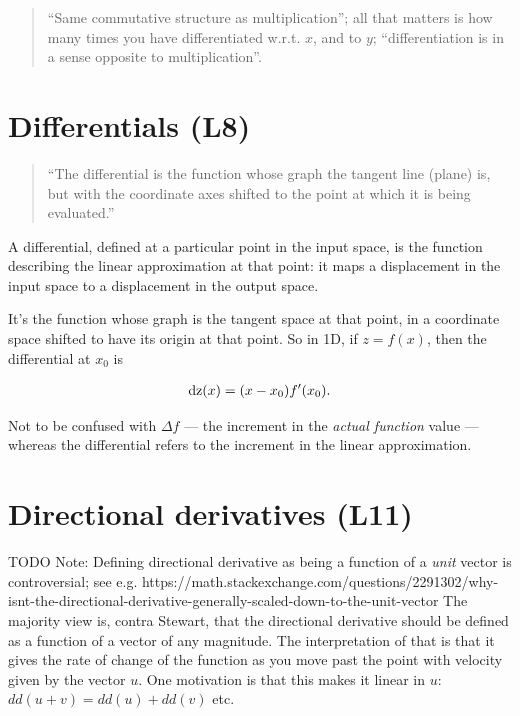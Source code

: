 \documentclass[12pt]{article}
\begin{document}
\begin{quote}
``Same commutative structure as multiplication''; all that matters
is how many times you have differentiated w.r.t. $x$, and to $y$;
``differentiation is in a sense opposite to multiplication''.
\end{quote}

\section{Differentials (L8)}

\begin{quote}
  ``The differential is the function whose graph the tangent line (plane) is,
  but with the coordinate axes shifted to the point at which it is being
  evaluated.''
\end{quote}

A differential, defined at a particular point in the input space, is the
function describing the linear approximation at that point: it maps a
displacement in the input space to a displacement in the output space.

It's the function whose graph is the tangent space at that point, in a
coordinate space shifted to have its origin at that point. So in 1D, if
$z = f(x)$, then the differential at $x_0$ is

\begin{align*}
  \operatorname{\text{dz}}(x) = (x - x_0)f'(x_0).
\end{align*}


Not to be confused with $\Delta f$ --- the increment in the \textit{actual
  function} value --- whereas the differential refers to the increment in the
linear approximation.


\section{Directional derivatives (L11)}

TODO Note: Defining directional derivative as being a function of a \textit{unit}
vector is controversial; see
e.g. https://math.stackexchange.com/questions/2291302/why-isnt-the-directional-derivative-generally-scaled-down-to-the-unit-vector
The majority view is, contra Stewart, that the directional derivative should be
defined as a function of a vector of any magnitude. The interpretation of that
is that it gives the rate of change of the function as you move past the point
with velocity given by the vector $u$. One motivation is that this makes it
linear in $u$: $dd(u + v) = dd(u) + dd(v)$ etc.
\end{document}
